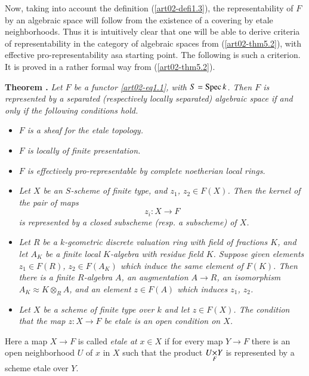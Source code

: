 Now, taking into account the definition (\ref{art02-defi1.3}), the representability of $F$ by an algebraic space will follow from the existence of a covering by etale neighborhoods. Thus it is intuitively clear that one will be able to derive criteria of representability in the category of algebraic spaces from (\ref{art02-thm5.2}), with effective pro-representability as\pageoriginale a starting point. The following is such a criterion. It is proved in a rather formal way from (\ref{art02-thm5.2}).

\medskip
\noindent
{\bf Theorem .\label{art02-thm5.6}}
{\em Let $F$ be a functor \eqref{art02-eq1.1}, with $S=\operatorname{Spec} k$. Then $F$ is represented by a separated (respectively locally separated) algebraic space if and only if the following conditions hold.}
\begin{itemize}
\item[{\rm[0]}] {\em $F$ is a sheaf for the etale topology.}

\item[{\rm[1]}] {\em $F$ is locally of finite presentation.}

\item[{\rm[2]}] {\em $F$ is effectively pro-representable by complete noetherian local rings.}

\item[{\rm[3]}] {\em Let $X$ be an $S$-scheme of finite type, and $z_{1}$, $z_{2}\in F(X)$. Then the kernel of the pair of maps}
$$
z_{i}:X\to F
$$
{\em is represented by a closed subscheme (resp. a subscheme) of $X$.}

\item[{\rm[4]}] {\em Let $R$ be a $k$-geometric discrete valuation ring with field of fractions $K$, and let $A_{K}$ be a finite local $K$-algebra with residue field $K$. Suppose given elements $z_{1}\in F(R)$, $z_{2}\in F(A_{K})$ which induce the same element of $F(K)$. Then there is a finite $R$-algebra $A$, an augmentation $A\to R$, an isomorphism $A_{K}\approx K\otimes_{R}A$, and an element $z\in F(A)$ which induces $z_{1}$, $z_{2}$.}

\item[{\rm[5]}] {\em Let $X$ be a scheme of finite type over $k$ and let $z\in F(X)$. The condition that the map $z:X\to F$ be etale is an open condition on $X$.}
\end{itemize}

\noindent
Here a map $X\to F$ is called {\em etale at} $x\in X$ if for every map $Y\to F$ there is an open neighborhood $U$ of $x$ in $X$ such that the product $\fprod{U}{Y}{F}$ is represented by a scheme etale over $Y$.

